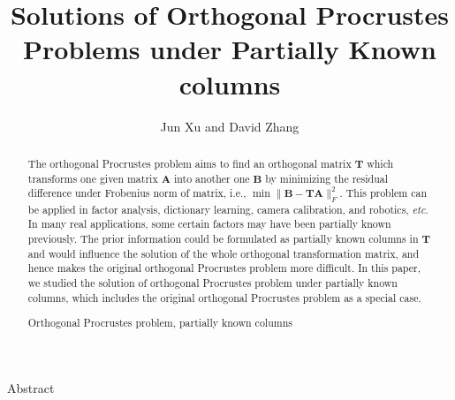 \documentclass[titlepage,11pt,twoside]{article}
\begin{document}

\title{Solutions of Orthogonal Procrustes Problems under Partially Known columns}

\author{Jun Xu and David Zhang }






\begin{center}\vskip3pt


\vspace{32pt}

Abstract\vskip3pt

\end{center}


\begin{abstract}
The orthogonal Procrustes problem aims to find an orthogonal matrix $\mathbf{T}$ which transforms one given matrix $\mathbf{A}$ into another one $\mathbf{B}$ by minimizing the residual difference under Frobenius norm of matrix, i.e., $\min\|\mathbf{B}-\mathbf{T}\mathbf{A}\|_{F}^{2}$. This problem can be applied in factor analysis, dictionary learning, camera calibration, and robotics, \emph{etc}. In many real applications, some certain factors may have been partially known previously. The prior information could be formulated as partially known columns in $\mathbf{T}$ and would influence the solution of the whole orthogonal transformation matrix, and hence makes the original orthogonal Procrustes problem more difficult. In this paper, we studied the solution of orthogonal Procrustes problem under partially known columns, which includes the original orthogonal Procrustes problem as a special case.
\begin{keywords}
Orthogonal Procrustes problem, partially known columns
\end{keywords}
\end{abstract}
\end{document}
